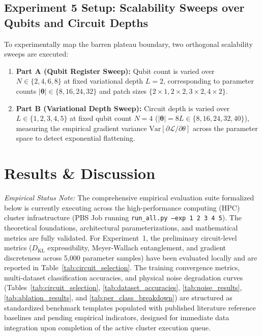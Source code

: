 \documentclass[journal]{IEEEtran}
\begin{document}
\subsection{Experiment 5 Setup: Scalability Sweeps over Qubits and Circuit Depths}
To experimentally map the barren plateau boundary, two orthogonal scalability sweeps are executed:
\begin{enumerate}
    \item \textbf{Part A (Qubit Register Sweep):} Qubit count is varied over $N \in \{2, 4, 6, 8\}$ at fixed variational depth $L = 2$, corresponding to parameter counts $|\boldsymbol{\theta}| \in \{8, 16, 24, 32\}$ and patch sizes $\{2\times 1, 2\times 2, 3\times 2, 4\times 2\}$.
    \item \textbf{Part B (Variational Depth Sweep):} Circuit depth is varied over $L \in \{1, 2, 3, 4, 5\}$ at fixed qubit count $N = 4$ ($|\boldsymbol{\theta}| = 8L \in \{8, 16, 24, 32, 40\}$), measuring the empirical gradient variance $\mathrm{Var}[\partial\mathcal{L}/\partial\theta]$ across the parameter space to detect exponential flattening.
\end{enumerate}

\section{Results \& Discussion}
\label{sec:results}

\textit{Empirical Status Note:} The comprehensive empirical evaluation suite formalized below is currently executing across the high-performance computing (HPC) cluster infrastructure (PBS Job running \texttt{run\_all.py --exp 1 2 3 4 5}). The theoretical foundations, architectural parameterizations, and mathematical metrics are fully validated. For Experiment~1, the preliminary circuit-level metrics ($D_{\mathrm{KL}}$ expressibility, Meyer-Wallach entanglement, and gradient discreteness across 5,000 parameter samples) have been evaluated locally and are reported in Table~\ref{tab:circuit_selection}. The training convergence metrics, multi-dataset classification accuracies, and physical noise degradation curves (Tables~\ref{tab:circuit_selection}, \ref{tab:dataset_accuracies}, \ref{tab:noise_results}, \ref{tab:ablation_results}, and \ref{tab:per_class_breakdown}) are structured as standardized benchmark templates populated with published literature reference baselines \cite{liu2026parallel, senokosov2024quantum, huang2021experimental, shi2022quantum} and pending empirical indicators, designed for immediate data integration upon completion of the active cluster execution queue.
\end{document}
